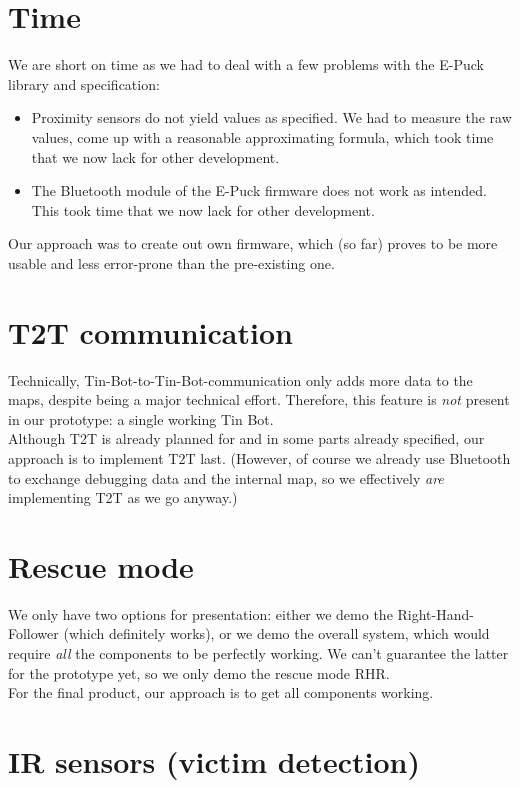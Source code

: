 \documentclass[a4paper,parskip,headheight=38pt]{scrartcl} %
\begin{document}
\section{Time}

We are short on time as we had to deal with a few problems with the
E-Puck library and specification:
\begin{itemize}
    \item Proximity sensors do not yield values as specified.  We had
    to measure the raw values, come up with a reasonable approximating
    formula, which took time that we now lack for other development.
    \item The Bluetooth module of the E-Puck firmware does not work as
    intended.  This took time that we now lack for other development.
\end{itemize}

Our approach was to create out own firmware, which (so far) proves to
be more usable and less error-prone than the pre-existing one.

\section{T2T communication}

Technically, Tin-Bot-to-Tin-Bot-communication only adds more data to
the maps, despite being a major technical effort.  Therefore, this
feature is \emph{not} present in our prototype: a single working Tin
Bot.
 \\
Although T2T is already planned for and in some parts already
specified, our approach is to implement T2T last.  (However, of course
we already use Bluetooth to exchange debugging data and the internal
map, so we effectively \emph{are} implementing T2T as we go anyway.)

\section{Rescue mode}

We only have two options for presentation: either we demo the
Right-Hand-Follower (which definitely works), or we demo the overall
system, which would require \emph{all} the components to be perfectly
working.  We can't guarantee the latter for the prototype yet, so we
only demo the rescue mode RHR.
 \\
For the final product, our approach is to get all components working.

\section{IR sensors (victim detection)}
\end{document}
